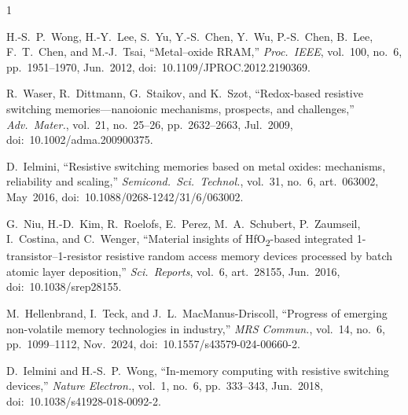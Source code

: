 \documentclass[lettersize,journal]{IEEEtran}
\begin{document}
\begin{thebibliography}{1}


H.-S.\ P.\ Wong, H.-Y.\ Lee, S.\ Yu, Y.-S.\ Chen, Y.\ Wu, P.-S.\ Chen, B.\ Lee, F.\ T.\ Chen, and M.-J.\ Tsai, ``Metal--oxide RRAM,'' \textit{Proc.\ IEEE}, vol.\ 100, no.\ 6, pp.\ 1951--1970, Jun.\ 2012, doi:~10.1109/JPROC.2012.2190369.

R.\ Waser, R.\ Dittmann, G.\ Staikov, and K.\ Szot, ``Redox-based resistive switching memories---nanoionic mechanisms, prospects, and challenges,'' \textit{Adv.\ Mater.}, vol.\ 21, no.\ 25--26, pp.\ 2632--2663, Jul.\ 2009, doi:~10.1002/adma.200900375.

D.\ Ielmini, ``Resistive switching memories based on metal oxides: mechanisms, reliability and scaling,'' \textit{Semicond.\ Sci.\ Technol.}, vol.\ 31, no.\ 6, art.\ 063002, May~2016, doi:~10.1088/0268-1242/31/6/063002.

G.\ Niu, H.-D.\ Kim, R.\ Roelofs, E.\ Perez, M.\ A.\ Schubert, P.\ Zaumseil, I.\ Costina, and C.\ Wenger, ``Material insights of HfO\textsubscript{2}-based integrated 1-transistor--1-resistor resistive random access memory devices processed by batch atomic layer deposition,'' \textit{Sci.\ Reports}, vol.\ 6, art.\ 28155, Jun.\ 2016, doi:~10.1038/srep28155.

M.\ Hellenbrand, I.\ Teck, and J.\ L.\ MacManus-Driscoll, ``Progress of emerging non-volatile memory technologies in industry,'' \textit{MRS Commun.}, vol.\ 14, no.\ 6, pp.\ 1099--1112, Nov.\ 2024, doi:~10.1557/s43579-024-00660-2.

D.\ Ielmini and H.-S.\ P.\ Wong, ``In-memory computing with resistive switching devices,'' \textit{Nature Electron.}, vol.\ 1, no.\ 6, pp.\ 333--343, Jun.\ 2018, doi:~10.1038/s41928-018-0092-2.

\end{thebibliography}
\end{document}
